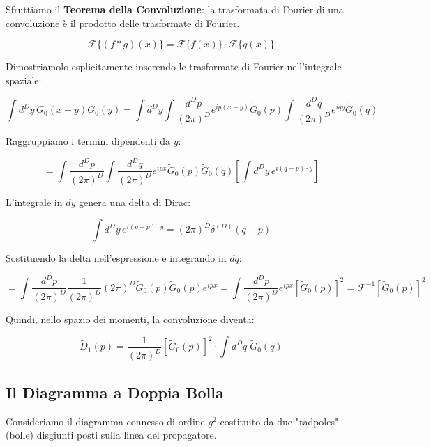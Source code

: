 Sfruttiamo il \textbf{Teorema della Convoluzione}: la trasformata di Fourier di una convoluzione è il prodotto delle trasformate di Fourier.

\begin{equation}
\mathcal{F} \{ (f * g)(x) \} = \mathcal{F} \{ f(x) \} \cdot \mathcal{F} \{ g(x) \}
\end{equation}

\noindent Dimostriamolo esplicitamente inserendo le trasformate di Fourier nell'integrale spaziale:

\begin{equation}
\int d^D y \, G_0(x-y) G_0(y) = \int d^D y \int \frac{d^D p}{(2\pi)^D} e^{i p(x-y)} \tilde{G}_0(p) \int \frac{d^D q}{(2\pi)^D} e^{i q y} \tilde{G}_0(q)
\end{equation}

Raggruppiamo i termini dipendenti da $y$:

\begin{equation}
= \int \frac{d^D p}{(2\pi)^D} \int \frac{d^D q}{(2\pi)^D} e^{i p x} \tilde{G}_0(p) \tilde{G}_0(q) \left[ \int d^D y \, e^{i(q-p) \cdot y} \right]
\end{equation}

L'integrale in $dy$ genera una delta di Dirac:

\begin{equation}
\int d^D y \, e^{i(q-p) \cdot y} = (2\pi)^D \delta^{(D)}(q-p)
\end{equation}

Sostituendo la delta nell'espressione e integrando in $dq$:

\begin{equation}
= \int \frac{d^D p}{(2\pi)^D} \frac{1}{(2\pi)^D} (2\pi)^D \tilde{G}_0(p) \tilde{G}_0(p) e^{i p x} = \int \frac{d^D p}{(2\pi)^D} e^{i p x} \left[ \tilde{G}_0(p) \right]^2 = \mathcal{F}^{-1} \left[ \tilde{G}_0(p) \right]^2
\end{equation}

\noindent Quindi, nello spazio dei momenti, la convoluzione diventa:

\begin{tcolorbox}[colback=colorA!10, colframe=colorB!60!colorA,  title=\textbf{Diagramma ad una bolla}]
\begin{equation}
\tilde{D}_1(p) = \frac{1}{(2\pi)^D} \left[ \tilde{G}_0(p) \right]^2 \cdot \int d^Dq \; \tilde{G}_0(q)
\end{equation}
\end{tcolorbox}

\newpage
\subsection{Il Diagramma a Doppia Bolla}
Consideriamo il diagramma connesso di ordine $g^2$ costituito da due "tadpoles" (bolle) disgiunti posti sulla linea del propagatore.


